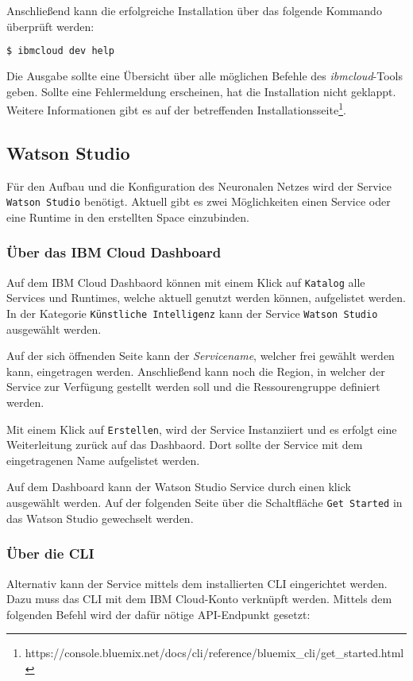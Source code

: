 Anschließend kann die erfolgreiche Installation über das folgende Kommando überprüft werden:

\begin{lstlisting}[language=bash, caption=Installation des CLI überprüfen, label=Installation des CLI überprüfen]
    $ ibmcloud dev help
\end{lstlisting}

Die Ausgabe sollte eine Übersicht über alle möglichen Befehle des \textit{ibmcloud}-Tools geben. Sollte eine Fehlermeldung
erscheinen, hat die Installation nicht geklappt. Weitere Informationen gibt es auf der betreffenden
Installationsseite\footnote{https://console.bluemix.net/docs/cli/reference/bluemix\_cli/get\_started.html}.

\subsection{Watson Studio}
Für den Aufbau und die Konfiguration des Neuronalen Netzes wird der Service \texttt{Watson Studio} benötigt. Aktuell gibt
es zwei Möglichkeiten einen Service oder eine Runtime in den erstellten Space einzubinden.

\subsubsection*{Über das IBM Cloud Dashboard}
Auf dem IBM Cloud Dashbaord können mit einem Klick auf \texttt{Katalog} alle Services und Runtimes, welche aktuell genutzt
werden können, aufgelistet werden. In der Kategorie \texttt{Künstliche Intelligenz} kann der Service \texttt{Watson Studio}
ausgewählt werden.

Auf der sich öffnenden Seite kann der \textit{Servicename}, welcher frei gewählt werden kann, eingetragen werden.
Anschließend kann noch die Region, in welcher der Service zur Verfügung gestellt werden soll und die Ressourengruppe
definiert werden.

Mit einem Klick auf \texttt{Erstellen}, wird der Service Instanziiert und es erfolgt eine Weiterleitung zurück auf das
Dashbaord. Dort sollte der Service mit dem eingetragenen Name aufgelistet werden.

Auf dem Dashboard kann der Watson Studio Service durch einen klick ausgewählt werden. Auf der folgenden Seite über die
Schaltfläche \texttt{Get Started} in das Watson Studio gewechselt werden.

\subsubsection*{Über die CLI}
Alternativ kann der Service mittels dem installierten CLI eingerichtet werden. Dazu muss das CLI mit dem IBM
Cloud-Konto verknüpft werden. Mittels dem folgenden Befehl wird der dafür nötige API-Endpunkt gesetzt:

